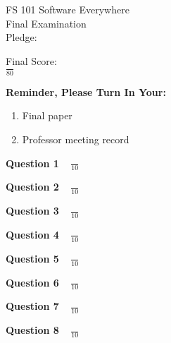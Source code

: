 \documentclass[12pt]{article}
\begin{document}
\vspace*{1in}

\begin{center}

FS 101 Software Everywhere \\
Final Examination \\
Pledge: \\

\vspace*{2in}

Final Score: \\ \vspace*{.5in} {\LARGE $\frac{}{80}$}

\vspace*{2in}

\begin{center}

  {\bf Reminder, Please Turn In Your:}

  \begin{enumerate}


  \item Final paper

  \item Professor meeting record

  \end{enumerate}

\end{center}

\end{center}

\newpage

{\bf Question 1} {\Large $\;\;\;\frac{}{10}$ }

\newpage

{\bf Question 2} {\Large $\;\;\; \frac{}{10}$ }

\newpage

{\bf Question 3} {\Large $\;\;\; \frac{}{10}$ }

\newpage

{\bf Question 4} {\Large $\;\;\; \frac{}{10}$ }

\newpage

{\bf Question 5} {\Large $\;\;\; \frac{}{10}$ }

\newpage

{\bf Question 6} {\Large $\;\;\; \frac{}{10}$ }

\newpage

{\bf Question 7} {\Large $\;\;\; \frac{}{10}$ }

\newpage

{\bf Question 8} {\Large $\;\;\; \frac{}{10}$ }

\newpage




\end{document}
